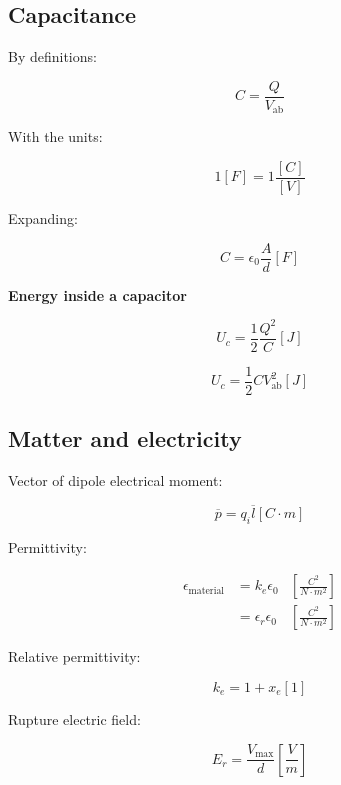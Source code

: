 \documentclass[letterpaper]{article}
\newcommand{\divline}{\noindent\makebox[\linewidth]{\rule{\textwidth}{0.4pt}}}
\begin{document}
    \divline
    \begin{multicols}{3}
        \section{Capacitance}

        By definitions:

        \[C = \frac{Q}{V_{\text{ab}}}\]

        With the units:

        \[ 1[F] = 1\frac{[C]}{[V]}\]

        Expanding:

        \[C = \epsilon_{0} \frac{A}{d} [F]\]

        \textbf{Energy inside a capacitor}
        
        \[U_{c} = \frac{1}{2} \frac{Q^{2}}{C} [J]\]

        \[U_{c} = \frac{1}{2} C V^{2}_{\text{ab}} [J]\]
        
    \end{multicols}

    \divline
    \begin{multicols}{3}
        \section{Matter and electricity}

        Vector of dipole electrical moment:

        \[\overline{p}  = q_{i} \overline{l} [C \cdot m]\]

        Permittivity:

        \begin{align*}
            \epsilon_{\text{material}} &= k_{e} \epsilon_{0} &\left[ \frac{C^{2}}{N \cdot m^{2}} \right] \\
                &= \epsilon_{r} \epsilon_{0} &\left[ \frac{C^{2}}{N \cdot m^{2}} \right]
        \end{align*}

        Relative permittivity:

        \[k_{e} = 1 + x_{e} [1]\]

        Rupture electric field:

        \[E_{r} = \frac{V_{\text{max}}}{d} \left[ \frac{V}{m} \right]\]
    \end{multicols}
\end{document}

